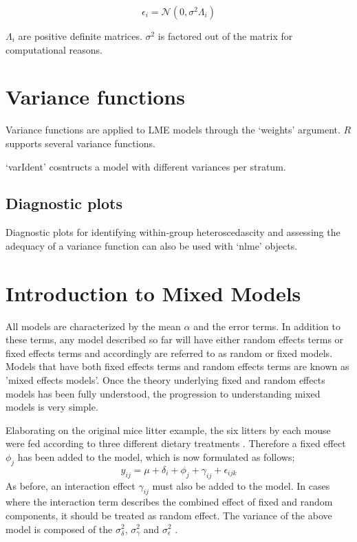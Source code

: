\documentclass[12pt, a4paper]{report}
\theoremstyle{plain}
\theoremstyle{definition}
\theoremstyle{remark}
\begin{document}
\begin{equation}
\epsilon_{i} = \mathcal{N}(0, \sigma^2 \Lambda_{i})
\end{equation}

$\Lambda_{i}$ are positive definite matrices. $\sigma^2$ is factored out of the matrix for computational reasons.


\section{Variance functions}

Variance functions are applied to LME models through the `weights' argument. $R$ supports several variance functions.

`varIdent' cosntructs a model with different variances per stratum.

\subsection{Diagnostic plots}
Diagnostic plots for identifying within-group heteroscedascity and assessing the adequacy of a variance function can also be used with `nlme' objects.



\section{Introduction to Mixed Models}


All models are characterized by the mean $\alpha$ and the error
terms. In addition to these terms, any model described so far will
have either random effects terms or fixed effects terms and
accordingly are referred to as random or fixed models. Models that
have both fixed effects terms and random effects terms are known
as 'mixed effects models'. Once the theory underlying fixed and
random effects models has been fully understood, the progression
to understanding mixed models is very simple.

Elaborating on the original mice litter example, the six litters
by each mouse were fed according to three different dietary
treatments \citep{Searle}. Therefore a fixed effect $\phi_{j}$ has
been added to the model, which is now formulated as follows;
\begin{equation}
y_{ij} = \mu + \delta_{i} + \phi_{j} + \gamma_{ij} +
\epsilon_{ijk}
\end{equation}
As before, an interaction effect $\gamma_{ij}$ must also be added
to the model. In cases where the interaction term describes the
combined effect of fixed and random components, it should be
treated as random effect. The variance of the above model is
composed of the $\sigma^{2}_{\delta}$, $\sigma^{2}_{\gamma}$ and
$\sigma^{2}_{\epsilon}$ .
\end{document}
